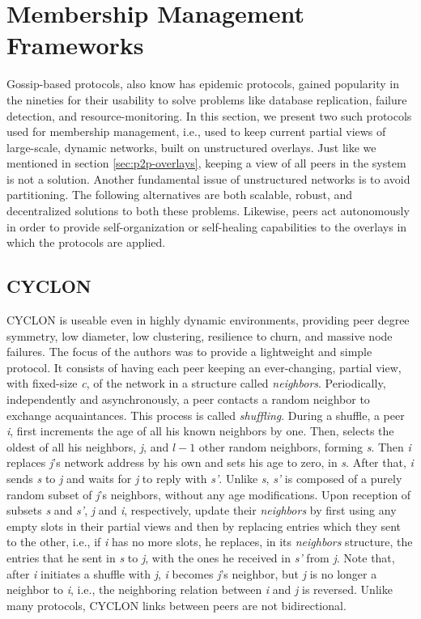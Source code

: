 \documentclass[runningheads]{llncs}
\begin{document}
\section{Membership Management Frameworks}\label{sec:membership-management}

Gossip-based protocols, also know has epidemic protocols, gained popularity in the nineties for their usability to solve problems like database replication, failure detection, and resource-monitoring. In this section, we present two such protocols used for membership management, i.e., used to keep current partial views of large-scale, dynamic networks, built on unstructured overlays. Just like we mentioned in section \ref{sec:p2p-overlays}, keeping a view of all peers in the system is not a solution. Another fundamental issue of unstructured networks is to avoid partitioning. The following alternatives are both scalable, robust, and decentralized solutions to both these problems. Likewise, peers act autonomously in order to provide self-organization or self-healing capabilities to the overlays in which the protocols are applied.

\subsection{CYCLON} CYCLON\cite{cyclon} is useable even in highly dynamic environments, providing peer degree symmetry, low diameter, low clustering, resilience to churn, and massive node failures. The focus of the authors was to provide a lightweight and simple protocol. It consists of having each peer keeping an ever-changing, partial view, with fixed-size \textit{c}, of the network in a structure called \textit{neighbors}. Periodically, independently and asynchronously, a peer contacts a random neighbor to exchange acquaintances. This process is called \textit{shuffling}. During a shuffle, a peer \textit{i}, first increments the age of all his known neighbors by one. Then, selects the oldest of all his neighbors, \textit{j}, and $l-1$ other random neighbors, forming \textit{s}. Then \textit{i} replaces \textit{j}'s network address by his own and sets his age to zero, in \textit{s}. After that, \textit{i} sends \textit{s} to \textit{j} and waits for \textit{j} to reply with \textit{s'}. Unlike \textit{s}, \textit{s'} is composed of a purely random subset of \textit{j}'s neighbors, without any age modifications. Upon reception of subsets \textit{s} and \textit{s'}, \textit{j} and \textit{i}, respectively, update their \textit{neighbors} by first using any empty slots in their partial views and then by replacing entries which they sent to the other, i.e., if \textit{i} has no more slots, he replaces, in its \textit{neighbors} structure, the entries that he sent in \textit{s} to \textit{j}, with the ones he received in \textit{s'} from \textit{j}. Note that, after \textit{i} initiates a shuffle with \textit{j}, \textit{i} becomes \textit{j}'s neighbor, but \textit{j} is no longer a neighbor to \textit{i}, i.e., the neighboring relation between \textit{i} and \textit{j} is reversed. Unlike many protocols, CYCLON links between peers are not bidirectional.
\end{document}
